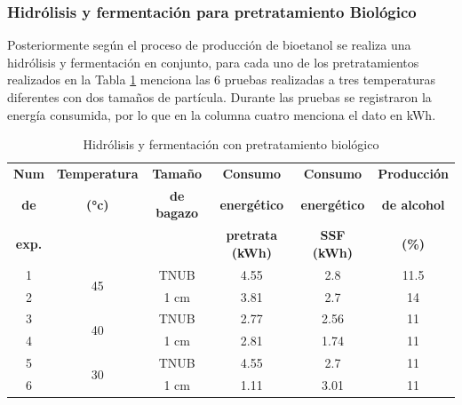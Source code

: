 \documentclass[12pt]{article}
\begin{document}
   	\subsubsection{ Hidrólisis y fermentación para pretratamiento Biológico}
   
   Posteriormente según el proceso de producción de bioetanol se realiza una hidrólisis y fermentación en conjunto, para cada uno de los pretratamientos realizados en la Tabla \ref{ssf Pretratamiento Biológico} menciona las 6 pruebas realizadas a tres temperaturas diferentes con dos tamaños de partícula. Durante las pruebas se registraron la energía consumida, por lo que en la columna cuatro menciona el dato en kWh.

 	\begin{table}[H]
 		\centering
 		\caption{Hidrólisis y fermentación con pretratamiento biológico}
 		\begin{tabular}{|c|c|c|c|c|c|}
 			\hline
 			\textbf{Num }& \textbf{Temperatura}  & \textbf{Tamaño} & \textbf{Consumo } & \textbf{Consumo }  & \textbf{Producción} \\ 
 			\textbf{de}&\textbf{(°c)} &\textbf{de bagazo} & \textbf{energético} & \textbf{energético }&\textbf{de alcohol}\\ 
 				\textbf{exp.}&& & \textbf{ pretrata (kWh)} & \textbf{ SSF (kWh)}&\textbf{(\%)}\\ \hline
 			
 			1 & \multirow{2}{*}{45} & TNUB & 4.55 & 2.8  & 11.5 \\ \cline{1-1} \cline{3-6}
 			2 &                     & 1 cm & 3.81 & 2.7  & 14 \\ \hline
 			3 & \multirow{2}{*}{40} & TNUB & 2.77 & 2.56 & 11 \\ \cline{1-1} \cline{3-6}
 			4 &                     & 1 cm & 2.81 & 1.74  & 11 \\  \hline
 			5 & \multirow{2}{*}{30} & TNUB & 4.55 &2.7  & 11 \\ \cline{1-1} \cline{3-6}
 			6 &                     & 1 cm & 1.11 &3.01 & 11 \\ \hline
 		\end{tabular}
 		\label{ssf Pretratamiento Biológico}
 	\end{table}
 	
 
 	
 	
 

 	
\end{document}
